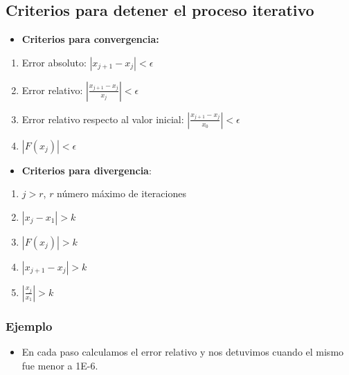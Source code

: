 \documentclass[openany]{book}
\providecommand{\tightlist}{%
  \setlength{\itemsep}{0pt}\setlength{\parskip}{0pt}}
\begin{document}
\hypertarget{criterios-para-detener-el-proceso-iterativo}{%
\subsection{Criterios para detener el proceso iterativo}\label{criterios-para-detener-el-proceso-iterativo}}

\begin{itemize}
\tightlist
\item
  \textbf{Criterios para convergencia:}
\end{itemize}

\begin{enumerate}
\def\labelenumi{\arabic{enumi}.}
\item
  Error absoluto: \(|x_{j+1}-x_j| < \epsilon\)
\item
  Error relativo: \(\left|\frac{x_{j+1}-x_j}{x_j}\right| < \epsilon\)
\item
  Error relativo respecto al valor inicial: \(\left|\frac{x_{j+1}-x_j}{x_0}\right| < \epsilon\)
\item
  \(|F(x_j)| < \epsilon\)
\end{enumerate}

\begin{itemize}
\tightlist
\item
  \textbf{Criterios para divergencia}:
\end{itemize}

\begin{enumerate}
\def\labelenumi{\arabic{enumi}.}
\item
  \(j > r\), \(r\) número máximo de iteraciones
\item
  \(|x_j - x_1| > k\)
\item
  \(|F(x_j)| > k\)
\item
  \(|x_{j+1}-x_j| > k\)
\item
  \(\left|\frac{x_{j}}{x_1}\right| > k\)
\end{enumerate}

\hypertarget{ejemplo-1}{%
\subsubsection*{Ejemplo}\label{ejemplo-1}}

\begin{itemize}
\tightlist
\item
  En cada paso calculamos el error relativo y nos detuvimos cuando el mismo fue menor a 1E-6.
\end{itemize}
\end{document}
